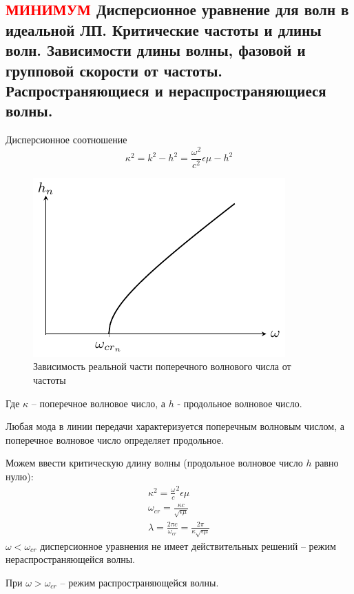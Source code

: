 
\subsection{\textcolor{red}{МИНИМУМ} Дисперсионное уравнение для волн в идеальной ЛП. Критические частоты и длины волн. Зависимости длины волны,
фазовой и групповой скорости от частоты. Распространяющиеся и нераспространяющиеся волны. }
Дисперсионное соотношение 
\begin{equation}
  \kappa^2 = k^2 - h^2 = \frac{\omega^2}{c^2}\epsilon\mu - h^2  
\end{equation}

\begin{figure}[h!]
  \centering
  \includegraphics[scale=1.6]{img/lect2_ris6}
  \caption{Зависимость реальной части поперечного волнового числа от частоты}
  \label{fig:wavegain:5}
\end{figure}
Где $\kappa$ -- поперечное волновое число, а $h$ - продольное волновое число. 

Любая мода в линии передачи характеризуется поперечным волновым числом, а поперечное волновое число определяет продольное.

Можем ввести критическую длину волны (продольное волновое число $h$ равно нулю):
\begin{gather*}
\kappa^2 = {\frac{\omega}{c}}^2 {\epsilon \mu}\\
\omega_{cr} = \frac{\kappa c}{\sqrt{\epsilon \mu}}\\
\lambda = \frac{2 \pi c}{\omega_{cr}} = \frac{2 \pi}{\kappa \sqrt{\epsilon \mu}}
\end{gather*}
$\omega < \omega_{cr}$ дисперсионное уравнения не имеет действительных решений -- режим нераспространяющейся волны. 

При  $\omega > \omega_{cr}$ -- режим распространяющейся волны.

